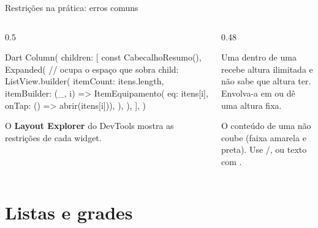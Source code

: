 \documentclass[aspectratio=169,10pt]{beamer}
\begin{document}
\begin{frame}[fragile]{Restrições na prática: erros comuns}
  \begin{columns}[T]
    \begin{column}{0.5\textwidth}
\begin{codigo}[title=Lista dentro de coluna]{Dart}
Column(
  children: [
    const CabecalhoResumo(),
    Expanded(            // ocupa o espaço que sobra
      child: ListView.builder(
        itemCount: itens.length,
        itemBuilder: (_, i) => ItemEquipamento(
            eq: itens[i], onTap: () => abrir(itens[i])),
      ),
    ),
  ],
)
\end{codigo}
      \begin{dica}
        O \textbf{Layout Explorer} do DevTools mostra as restrições de cada widget.
      \end{dica}
    \end{column}
    \begin{column}{0.48\textwidth}
      \begin{erro}
        Uma  dentro de uma  recebe altura ilimitada e não sabe que altura ter. Envolva-a em  ou dê uma altura fixa.
      \end{erro}
      \begin{erro}
        O conteúdo de uma  não coube (faixa amarela e preta). Use /,  ou texto com .
      \end{erro}
    \end{column}
  \end{columns}
\end{frame}

\section{Listas e grades}
\end{document}
